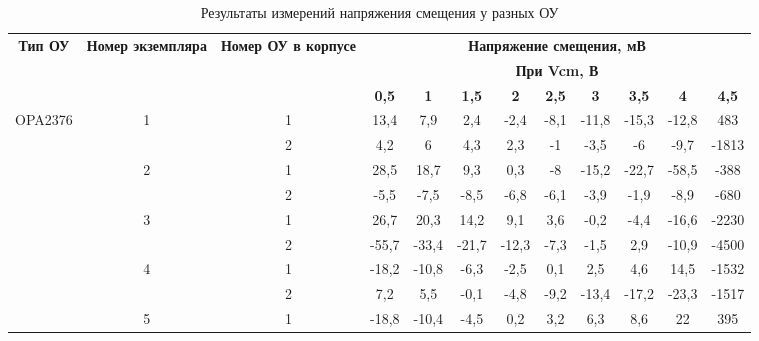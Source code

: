 \begin{table}[H]
    \begin{adjustwidth}{-1em}{}
    \centering
    \caption{Результаты измерений напряжения смещения у разных ОУ}
      \begin{tabular}{|c|c|c|c|c|c|c|c|c|c|c|c|}
      \hline
      \multicolumn{1}{|c|}{\multirow{3}[6]{2cm}{\textbf{Тип ОУ}}} & \multicolumn{1}{c|}{\multirow{3}[6]{1.4cm}{\textbf{Номер экземпляра}}} & \multicolumn{1}{c|}{\multirow{3}[6]{1.8cm}{\textbf{Номер ОУ в корпусе}}} & \multicolumn{9}{|c|}{\textbf{Напряжение смещения, мВ}} \bigstrut\\
  \cline{4-12}          &       &       & \multicolumn{9}{|c|}{\textbf{При Vcm, В}} \bigstrut\\
  \cline{4-12}          &       &       & \textbf{0,5} & \textbf{1} & \textbf{1,5} & \textbf{2} & \textbf{2,5} & \textbf{3} & \textbf{3,5} & \textbf{4} & \textbf{4,5} \bigstrut\\
      \hline
      \multicolumn{1}{|c|}{\multirow{10}[20]{*}{OPA2376 }} & \multirow{2}[4]{*}{1} & 1     & 13,4  & 7,9   & 2,4   & -2,4  & -8,1  & -11,8 & -15,3 & -12,8 & 483 \bigstrut\\
  \cline{3-12}          &       & 2     & 4,2   & 6     & 4,3   & 2,3   & -1    & -3,5  & -6    & -9,7  & -1813 \bigstrut\\
  \cline{2-12}          & \multirow{2}[4]{*}{2} & 1     & 28,5  & 18,7  & 9,3   & 0,3   & -8    & -15,2 & -22,7 & -58,5 & -388 \bigstrut\\
  \cline{3-12}          &       & 2     & -5,5  & -7,5  & -8,5  & -6,8  & -6,1  & -3,9  & -1,9  & -8,9  & -680 \bigstrut\\
  \cline{2-12}          & \multirow{2}[4]{*}{3} & 1     & 26,7  & 20,3  & 14,2  & 9,1   & 3,6   & -0,2  & -4,4  & -16,6 & -2230 \bigstrut\\
  \cline{3-12}          &       & 2     & -55,7 & -33,4 & -21,7 & -12,3 & -7,3  & -1,5  & 2,9   & -10,9 & -4500 \bigstrut\\
  \cline{2-12}   TI     & \multirow{2}[4]{*}{4} & 1     & -18,2 & -10,8 & -6,3  & -2,5  & 0,1   & 2,5   & 4,6   & 14,5  & -1532 \bigstrut\\
  \cline{3-12}          &       & 2     & 7,2   & 5,5   & -0,1  & -4,8  & -9,2  & -13,4 & -17,2 & -23,3 & -1517 \bigstrut\\
  \cline{2-12}          & \multirow{2}[4]{*}{5} & 1     & -18,8 & -10,4 & -4,5  & 0,2   & 3,2   & 6,3   & 8,6   & 22    & 395 \bigstrut\\

\end{tabular}
\end{adjustwidth}
\end{table}
